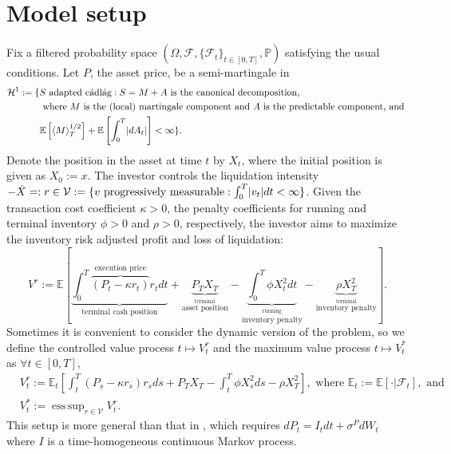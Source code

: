 \documentclass[openany,oneside]{article}
\theoremstyle{definition}
\theoremstyle{remark}
\newcommand{\E}{\mathbb{E}} %
\renewcommand{\P}{\mathbb{P}} %
\newcommand{\F}{\mathcal{F}} %
\DeclarePairedDelimiter{\abs}{\lvert}{\rvert} %
\newcommand{\ts}{\textstyle}
\DeclareMathOperator{\esssup}{ess\, sup}
\begin{document}
\section{Model setup}
Fix a filtered probability space $(\Omega, \F, \{\F_t\}_{t\in[0,T]}, \P)$ satisfying the usual conditions. Let $P$, the asset price, be a semi-martingale in
\begin{align*}
\mathcal{H}^1:=\{ & S \textrm{ adapted c\'adl\'ag} : S=M+A \textrm{ is the canonical decomposition, } \\
& \textrm{ where $M$ is the (local) martingale component and $A$ is the predictable component, and } \\
& \E\left[\langle M\rangle^{1/2}_T\right] + \E\left[\int_0^T \abs{d A_t}\right] < \infty\}.
\end{align*}
Denote the position in the asset at time $t$ by $X_t$, where the initial position is given as $X_0:=x$. The investor controls the liquidation intensity $-\dot{X} =: r \in \mathcal{V} := \{v \textrm{ progressively measurable} : \int_0^T \abs{v_t} dt < \infty \}$. Given the transaction cost coefficient $\kappa>0$, the penalty coefficients for running and terminal inventory $\phi>0$ and $\rho>0$, respectively, the investor aims to maximize the inventory risk adjusted profit and loss of liquidation:
\[
\ts V^r:= \E\left[\underbrace{\int_0^T \overbrace{(P_t - \kappa r_t)}^{\textrm{execution price}} r_t dt}_{\textrm{terminal cash position}} + \underbrace{P_T X_T}_{\stackrel{\textrm{terminal}}{\textrm{asset position}}} - \underbrace{\int_0^T \phi X_t^2 dt}_{\stackrel{\textrm{running}}{\textrm{inventory penalty}}} - \underbrace{\rho X_T^2}_{\stackrel{\textrm{terminal}}{\textrm{inventory penalty}}} \right].
\]
Sometimes it is convenient to consider the dynamic version of the problem, so we define the controlled value process $t\mapsto V^r_t$ and the maximum value process $t\mapsto V^\ast_t$ as $\forall t\in[0,T]$,
\begin{align*}
&\ts V^r_t := \E_t \left[\int_t^T (P_s-\kappa r_s)r_s ds + P_T X_T -\int_t^T \phi X_s^2 ds - \rho X_T^2 \right], \textrm{ where } \E_t:=\E[\cdot \vert \F_t], \textrm{ and} \\
&\ts V^\ast_t := \esssup_{r\in\mathcal{V}} V^r_t.
\end{align*}
This setup is more general than that in \cite{lehalle2017incorporating}, which requires $dP_t = I_t dt + \sigma^P dW_t$ where $I$ is a time-homogeneous continuous Markov process.
\end{document}
